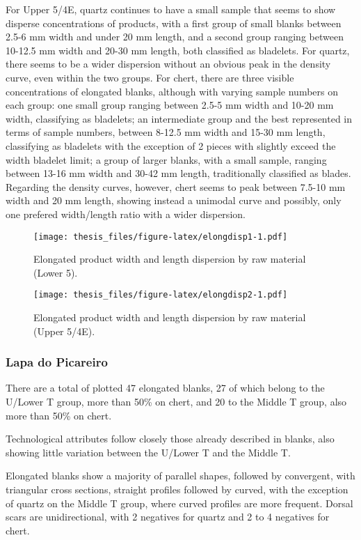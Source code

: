 \documentclass[12pt,twoside]{reedthesis}
\begin{document}
For Upper 5/4E, quartz continues to have a small sample that seems to show disperse concentrations of products, with a first group of small blanks between 2.5-6 mm width and under 20 mm length, and a second group ranging between 10-12.5 mm width and 20-30 mm length, both classified as bladelets. For quartz, there seems to be a wider dispersion without an obvious peak in the density curve, even within the two groups. For chert, there are three visible concentrations of elongated blanks, although with varying sample numbers on each group: one small group ranging between 2.5-5 mm width and 10-20 mm width, classifying as bladelets; an intermediate group and the best represented in terms of sample numbers, between 8-12.5 mm width and 15-30 mm length, classifying as bladelets with the exception of 2 pieces with slightly exceed the width bladelet limit; a group of larger blanks, with a small sample, ranging between 13-16 mm width and 30-42 mm length, traditionally classified as blades. Regarding the density curves, however, chert seems to peak between 7.5-10 mm width and 20 mm length, showing instead a unimodal curve and possibly, only one prefered width/length ratio with a wider dispersion.
\begin{figure}
\centering
\texttt{[image: thesis\_files/figure-latex/elongdisp1-1.pdf]}
\caption{\label{fig:elongdisp1}Elongated product width and length dispersion by raw material (Lower 5).}
\end{figure}
\begin{figure}
\centering
\texttt{[image: thesis\_files/figure-latex/elongdisp2-1.pdf]}
\caption{\label{fig:elongdisp2}Elongated product width and length dispersion by raw material (Upper 5/4E).}
\end{figure}
\hypertarget{lapa-do-picareiro-6}{%
\subsubsection{Lapa do Picareiro}\label{lapa-do-picareiro-6}}

There are a total of plotted 47 elongated blanks, 27 of which belong to the U/Lower T group, more than 50\% on chert, and 20 to the Middle T group, also more than 50\% on chert.

Technological attributes follow closely those already described in blanks, also showing little variation between the U/Lower T and the Middle T.

Elongated blanks show a majority of parallel shapes, followed by convergent, with triangular cross sections, straight profiles followed by curved, with the exception of quartz on the Middle T group, where curved profiles are more frequent. Dorsal scars are unidirectional, with 2 negatives for quartz and 2 to 4 negatives for chert.
\end{document}

